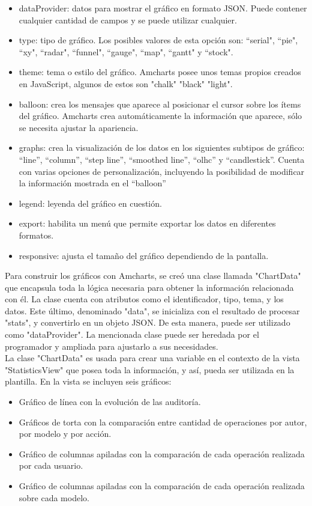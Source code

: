 \begin{itemize}
    \item dataProvider: datos para mostrar el gráfico en formato JSON. Puede contener cualquier cantidad de campos y se puede utilizar cualquier.
    \item type: tipo de gráfico. Los posibles valores de esta opción son: “serial", “pie", “xy", “radar", “funnel", “gauge", “map", “gantt" y “stock".
    \item theme: tema o estilo del gráfico. Amcharts posee unos temas propios creados en JavaScript, algunos de estos son "chalk" "black" "light".
    \item balloon: crea los mensajes que aparece al posicionar el cursor sobre los ítems del gráfico. Amcharts crea automáticamente la información que aparece, sólo se necesita ajustar la apariencia.
    \item graphs: crea la visualización de los datos en los siguientes subtipos de gráfico: “line”, “column”, “step line”, “smoothed line”, “olhc” y “candlestick”. Cuenta con varias opciones de personalización, incluyendo la posibilidad de modificar la información mostrada en el “balloon”
    \item legend: leyenda del gráfico en cuestión.
    \item export: habilita un menú que permite exportar los datos en diferentes formatos.
    \item responsive: ajusta el tamaño del gráfico dependiendo de la pantalla.
\end{itemize}


Para construir los gráficos con Amcharts, se creó una clase llamada "ChartData" que encapsula toda la lógica necesaria para obtener la información relacionada con él. La clase cuenta con atributos como el identificador, tipo, tema, y los datos. Este último, denominado "data", se inicializa con el resultado de procesar "stats", y convertirlo en un objeto JSON. De esta manera, puede ser utilizado como "dataProvider". La mencionada clase puede ser heredada por el programador y ampliada para ajustarlo a sus necesidades.\\

La clase "ChartData" es usada para crear una variable en el contexto de la vista "StatisticsView" que posea toda la información, y así, pueda ser utilizada en la plantilla. En la vista se incluyen seis gráficos:

\begin{itemize}
    \item Gráfico de línea con la evolución de las auditoría.
    \item Gráficos de torta con la comparación entre cantidad de operaciones por autor, por modelo y por acción.
    \item Gráfico de columnas apiladas con la comparación de cada operación realizada por cada usuario.
    \item Gráfico de columnas apiladas con la comparación de cada operación realizada sobre cada modelo.
\end{itemize}


